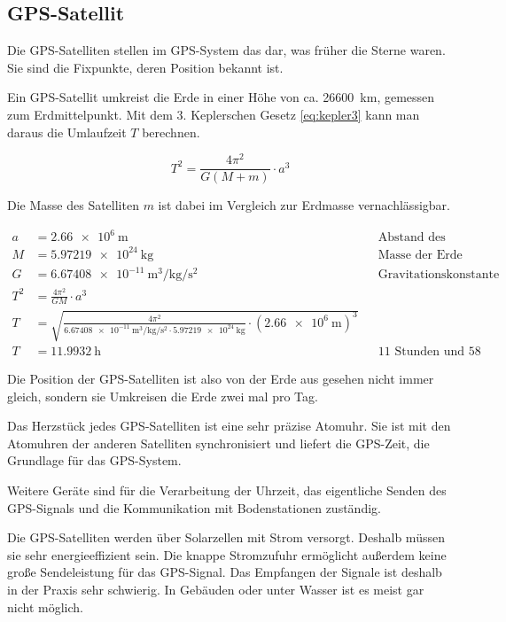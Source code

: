 \documentclass[12pt,a4paper]{scrartcl}
\begin{document}
\subsection{GPS-Satellit}
Die GPS-Satelliten stellen im GPS-System das dar, was früher die Sterne waren. Sie sind die Fixpunkte, deren Position bekannt ist.

Ein GPS-Satellit umkreist die Erde in einer Höhe von ca. \SI{26600}{\kilo\meter}, gemessen zum Erdmittelpunkt.
Mit dem 3. Keplerschen Gesetz \eqref{eq:kepler3} kann man daraus die Umlaufzeit $T$ berechnen.

\begin{equation}
\label{eq:kepler3}
T^2 = \frac{4 \pi^2}{G (M + m)} \cdot a^3
\end{equation}
\cite{wiki_kepler}

Die Masse des Satelliten $m$ ist dabei im Vergleich zur Erdmasse vernachlässigbar.

\begin{align*}
a &= \SI{2.66e6}{\meter} && \text{Abstand des Satelliten}\\
M &= \SI{5.97219e24}{\kilo\gram} && \text{Masse der Erde}\\
G &= \SI{6.67408e-11}{\cubic\meter\per\kilo\gram\per\square\second} && \text{Gravitationskonstante} \\
T^2 &= \frac{4 \pi^2}{G M} \cdot a^3 \\
T &= \sqrt{\frac{4 \pi^2}{\SI{6.67408e-11}{\cubic\meter\per\kilo\gram\per\square\second} \cdot \SI{5.97219e24}{\kilo\gram}} \cdot (\SI{2.66e6}{\meter})^3} \\
T &= \SI{11.9932}{\hour} && \text{11 Stunden und 58 Minuten}
\end{align*}

Die Position der GPS-Satelliten ist also von der Erde aus gesehen nicht immer gleich, sondern sie Umkreisen die Erde zwei mal pro Tag.

Das Herzstück jedes GPS-Satelliten ist eine sehr präzise Atomuhr. Sie ist mit den Atomuhren der anderen Satelliten synchronisiert und liefert die GPS-Zeit, die Grundlage für das GPS-System.

Weitere Geräte sind für die Verarbeitung der Uhrzeit, das eigentliche Senden des GPS-Signals und die Kommunikation mit Bodenstationen zuständig.

Die GPS-Satelliten werden über Solarzellen mit Strom versorgt. Deshalb müssen sie sehr energieeffizient sein. Die knappe Stromzufuhr ermöglicht außerdem keine große Sendeleistung für das GPS-Signal. Das Empfangen der Signale ist deshalb in der Praxis sehr schwierig. In Gebäuden oder unter Wasser ist es meist gar nicht möglich.
\end{document}
